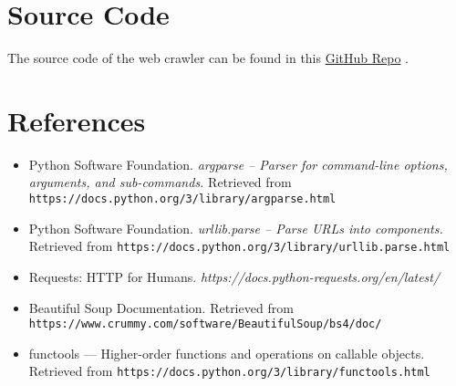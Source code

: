 \documentclass{article}
\begin{document}
\section{Source Code}
The source code of the web crawler can be found in this \href{http://www.overleaf.com}{GitHub Repo} .
%


\section{References}
\begin{itemize}
    \item Python Software Foundation. \textit{argparse – Parser for command-line options, arguments, and sub-commands.} Retrieved from \texttt{https://docs.python.org/3/library/argparse.html}
    \item Python Software Foundation. \textit{urllib.parse – Parse URLs into components.} Retrieved from \texttt{https://docs.python.org/3/library/urllib.parse.html}
    \item Requests: HTTP for Humans. \textit{https://docs.python-requests.org/en/latest/}
    \item Beautiful Soup Documentation. Retrieved from \texttt{https://www.crummy.com/software/BeautifulSoup/bs4/doc/}
    \item functools — Higher-order functions and operations on callable objects. Retrieved from \texttt{https://docs.python.org/3/library/functools.html}
\end{itemize}
\end{document}

